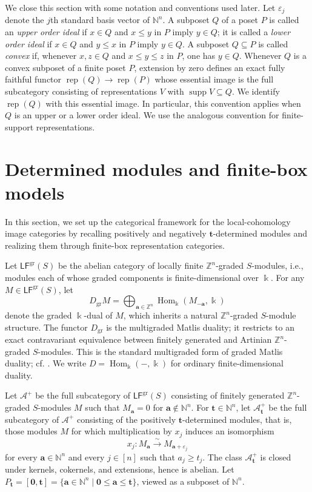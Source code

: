 \documentclass[12pt,reqno]{amsart}
\theoremstyle{definition}
\theoremstyle{remark}
\newcommand{\Rep}{\operatorname{rep}}
\newcommand{\Hom}{\operatorname{Hom}}
\newcommand{\LFgr}{\mathsf{LF}^{\mathrm{gr}}(S)}
\newcommand{\Dgr}{D_{\mathrm{gr}}}
\begin{document}
We close this section with some notation and conventions used later.  Let $\varepsilon_j$ denote the
$j$th standard basis vector of $\mathbb N^n$.  A subposet $Q$ of a
poset $P$ is called an \emph{upper order ideal} if $x\in Q$ and
$x\le y$ in $P$ imply $y\in Q$; it is called a \emph{lower order ideal}
if $x\in Q$ and $y\le x$ in $P$ imply $y\in Q$.  A subposet
$Q\subseteq P$ is called \emph{convex} if, whenever $x,z\in Q$ and
$x\le y\le z$ in $P$, one has $y\in Q$.  Whenever $Q$ is a convex
subposet of a finite poset $P$, extension by zero defines an exact fully
faithful functor $\Rep(Q)\to\Rep(P)$ whose essential image is the full
subcategory consisting of representations $V$ with
$\operatorname{supp}V\subseteq Q$.  We identify $\Rep(Q)$ with this
essential image.  In particular, this convention applies when $Q$ is an
upper or a lower order ideal.  We use the analogous convention for
finite-support representations.

\section{Determined modules and finite-box models}\label{sec:determined}
In this section, we set up the categorical framework for the local-cohomology image categories by recalling positively and negatively $\mathbf t$-determined modules and realizing them through finite-box representation categories.

Let $\LFgr$ be the abelian category of locally finite $\mathbb Z^n$-graded
$S$-modules, i.e., modules each of whose graded components is finite-dimensional over
$\Bbbk$. For any $M\in\LFgr$, let
\[
\Dgr M=\bigoplus_{\mathbf a\in \mathbb Z^n}\Hom_\Bbbk(M_{-\mathbf a},\Bbbk)
\]
denote the graded $\Bbbk$-dual of $M$, which inherits a natural
$\mathbb Z^n$-graded $S$-module structure. The functor $\Dgr$ is the
multigraded Matlis duality; it restricts to an exact contravariant equivalence
between finitely generated and Artinian $\mathbb Z^n$-graded
$S$-modules.  This is the standard multigraded form of graded Matlis duality;
cf. \cite[Theorem~3.6.17]{BH}. We write
$D=\Hom_\Bbbk(-,\Bbbk)$ for ordinary finite-dimensional duality.

Let $\mathcal A^+$ be the full subcategory of $\LFgr$ consisting of finitely
generated $\mathbb Z^n$-graded $S$-modules $M$ such that
$M_{\mathbf a}=0$ for $\mathbf a\notin\mathbb N^n$.  For $\mathbf t\in\mathbb N^n$, let $\mathcal A^+_{\mathbf t}$ be the full
subcategory of $\mathcal A^+$ consisting of the positively
$\mathbf t$-determined modules, that is, those modules $M$ for which
multiplication by $x_j$ induces an isomorphism
\[
x_j:M_{\mathbf a}\xrightarrow{\sim}M_{\mathbf a+\varepsilon_j}
\]
for every $\mathbf a\in\mathbb N^n$ and every $j\in[n]$ such that
$a_j\ge t_j$.
The class $\mathcal A^+_{\mathbf t}$ is closed under kernels, cokernels, and
extensions, hence is abelian. Let $P_{\mathbf t}=[\mathbf0,\mathbf t]
=\{\mathbf a\in\mathbb N^n\mid \mathbf0\le\mathbf a\le\mathbf t\}$,
viewed as a subposet of $\mathbb N^n$.
\end{document}

